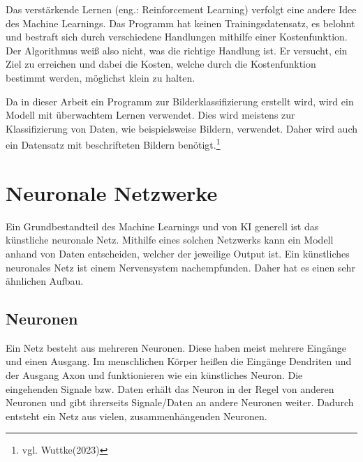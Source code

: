 \documentclass[11pt,oneside]{report}
\begin{document}
Das verstärkende Lernen (eng.: Reinforcement Learning) verfolgt eine andere Idee des Machine Learnings. Das Programm hat keinen Trainingsdatensatz, es belohnt und bestraft sich durch verschiedene Handlungen mithilfe einer Kostenfunktion. Der Algorithmus weiß also nicht, was die richtige Handlung ist. Er versucht, ein Ziel zu erreichen und dabei die Kosten, welche durch die Kostenfunktion bestimmt werden, möglichst klein zu halten.

Da in dieser Arbeit ein Programm zur Bilderklassifizierung erstellt wird, wird ein Modell mit überwachtem Lernen verwendet. Dies wird meistens zur Klassifizierung von Daten, wie beispielsweise Bildern, verwendet. Daher wird auch ein Datensatz mit beschrifteten Bildern benötigt.\footnote{vgl. Wuttke(2023)}


\section{Neuronale Netzwerke}
Ein Grundbestandteil des Machine Learnings und von KI generell ist das künstliche neuronale Netz. Mithilfe eines solchen Netzwerks kann ein Modell anhand von Daten entscheiden, welcher der jeweilige Output ist. Ein künstliches neuronales Netz ist einem Nervensystem nachempfunden. Daher hat es einen sehr ähnlichen Aufbau.

\subsection{Neuronen}
Ein Netz besteht aus mehreren Neuronen. Diese haben meist mehrere Eingänge und einen Ausgang. Im menschlichen Körper heißen die Eingänge Dendriten und der Ausgang Axon und funktionieren wie ein künstliches Neuron. Die eingehenden Signale bzw. Daten erhält das Neuron in der Regel von anderen Neuronen und gibt ihrerseits Signale/Daten an andere Neuronen weiter. Dadurch entsteht ein Netz aus vielen, zusammenhängenden Neuronen.
\end{document}
